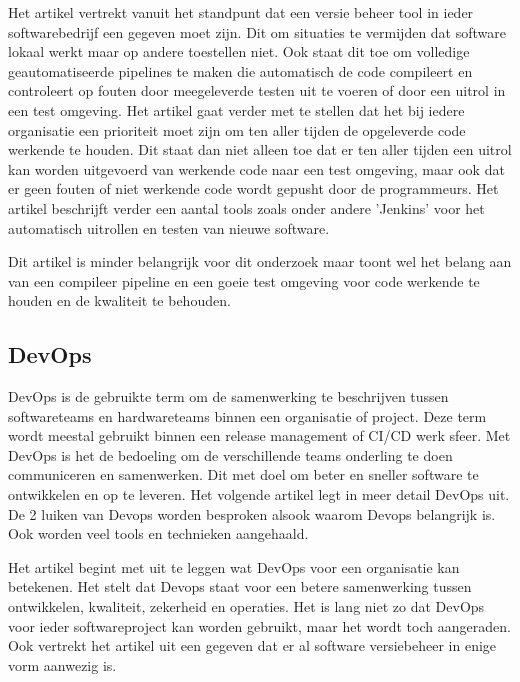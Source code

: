 Het artikel \autocite{Meyer2014} vertrekt vanuit het standpunt dat een versie beheer tool in ieder softwarebedrijf een gegeven moet zijn. Dit om situaties te vermijden dat software lokaal werkt maar op andere toestellen niet. Ook staat dit toe om volledige geautomatiseerde pipelines te maken die automatisch de code compileert en controleert op fouten door meegeleverde testen uit te voeren of door een uitrol in een test omgeving. Het artikel gaat verder met te stellen dat het bij iedere organisatie een prioriteit moet zijn om ten aller tijden de opgeleverde code werkende te houden. Dit staat dan niet alleen toe dat er ten aller tijden een uitrol kan worden uitgevoerd van werkende code naar een test omgeving, maar ook dat er geen fouten of niet werkende code wordt gepusht door de programmeurs. Het artikel beschrijft verder een aantal tools zoals onder andere 'Jenkins' voor het automatisch uitrollen en testen van nieuwe software.

Dit artikel \autocite{Meyer2014} is minder belangrijk voor dit onderzoek maar toont wel het belang aan van een compileer pipeline en een goeie test omgeving voor code werkende te houden en de kwaliteit te behouden.

\subsection{DevOps}
DevOps is de gebruikte term om de samenwerking te beschrijven tussen softwareteams en hardwareteams binnen een organisatie of project. Deze term wordt meestal gebruikt binnen een release management of CI/CD werk sfeer. Met DevOps is het de bedoeling om de verschillende teams onderling te doen communiceren en samenwerken. Dit met doel om beter en sneller software te ontwikkelen en op te leveren. Het volgende artikel \autocite{Ebert2016} legt in meer detail DevOps uit. De 2 luiken van Devops worden besproken alsook waarom Devops belangrijk is. Ook worden veel tools en technieken aangehaald.

Het artikel \autocite{Ebert2016} begint met uit te leggen wat DevOps voor een organisatie kan betekenen. Het stelt dat Devops staat voor een betere samenwerking tussen ontwikkelen, kwaliteit, zekerheid en operaties. Het is lang niet zo dat DevOps voor ieder softwareproject kan worden gebruikt, maar het wordt toch aangeraden. Ook vertrekt het artikel uit een gegeven dat er al software versiebeheer in enige vorm aanwezig is.

